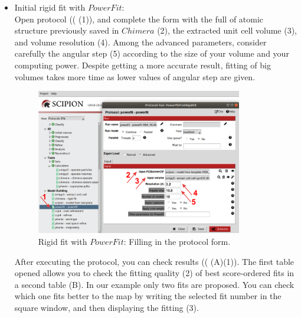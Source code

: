 \begin{itemize}
 \item Initial rigid fit with $PowerFit$:\\
 Open  protocol (( (1)), and complete the form with the full  of atomic structure previously saved in $Chimera$ (2), the extracted unit cell volume (3), and volume resolution (4). Among the advanced parameters, consider carefully the angular step (5) according to the size of your volume and your computing power. Despite getting a more accurate result, fitting of big volumes takes more time as  lower values of angular step are given.  
 
 \begin{figure}[H]
  \centering 
  \captionsetup{width=.7\linewidth} 
  \includegraphics[width=0.85\textwidth]{Images/Fig18.png}
  \caption{Rigid fit with $PowerFit$: Filling in the protocol form.}
  \label{fig:powerfit_protocol}
  \end{figure}
 
 After executing the  protocol, you can check results (( (A)(1)). The first table opened allows you to check the fitting quality (2) of best score-ordered fits in a second table (B). In our example only two fits are proposed. You can check which one fits better to the map by writing the selected fit number in the  square window, and then displaying the fitting (3).
 

\end{itemize}
